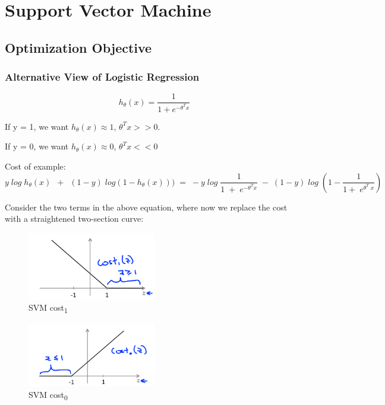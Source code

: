 \section{Support Vector Machine}

\subsection{Optimization Objective}
    \subsubsection{Alternative View of Logistic Regression}
        \[
            h_\theta(x) = \frac{1}{1 + e^{-\theta^T x}} 
        \] 

        If y = 1, we want $h_\theta(x) \approx 1$, $\theta^T x >> 0$. 
        \par If y = 0, we want $h_\theta(x) \approx 0$, $\theta^T x << 0$
        
        Cost of example:
        \[
            \boxed{
        y\;log\;h_\theta(x)\:\;+\:\;(1-y)\;log(1-h_\theta(x)))\;=\;-y\;log\;\frac{1}{1\;+\;e^{-\theta^Tx}}\;-\;(1-y)\;log\;(1-\frac{1}{1+\;e^{\theta^T\;x}})
            }
        \] 

        Consider the two terms in the above equation, where now we replace the cost with a straightened two-section curve:
 
        \begin{figure}[htbp]
            \centering
            \includegraphics[width=0.5\textwidth]{image/SVM-cost1.png}
            \caption{SVM cost\textsubscript{1}}
            \label{fig:SVM-cost1}
        \end{figure}

       \begin{figure}[htbp]
            \centering
            \includegraphics[width=0.5\textwidth]{image/SVM-cost0.png}
            \caption{SVM cost\textsubscript{0}}
            \label{fig:SVM-cost0}
        \end{figure}

